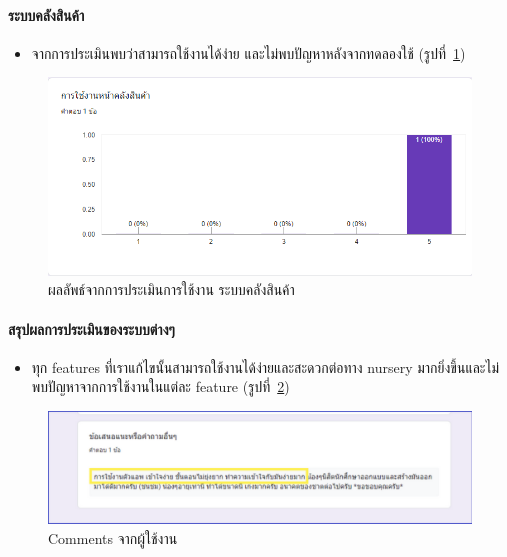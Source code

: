 \paragraph{ระบบคลังสินค้า}
\begin{itemize}
  \item จากการประเมินพบว่าสามารถใช้งานได้ง่าย และไม่พบปัญหาหลังจากทดลองใช้ (รูปที่~\ref{fig:Eval8})
\end{itemize}
\begin{figure}
  \begin{center}
    \includegraphics[width=\linewidth]{images/eval8.png}
  \end{center}
  \caption[ผลลัพธ์จากการประเมินการใช้งาน ระบบคลังสินค้า]{ผลลัพธ์จากการประเมินการใช้งาน ระบบคลังสินค้า}
  \label{fig:Eval8}
\end{figure}


\paragraph{สรุปผลการประเมินของระบบต่างๆ}
\begin{itemize}
  \item ทุก features ที่เราแก้ไขนั้นสามารถใช้งานได้ง่ายและสะดวกต่อทาง nursery มากยิ่งขึ้นและไม่พบปัญหาจากการใช้งานในแต่ละ feature (รูปที่~\ref{fig:Eval4})
\end{itemize}
\begin{figure}
  \begin{center}
    \includegraphics[width=\linewidth]{images/eval4.png}
  \end{center}
  \caption[Comments จากผู้ใช้งาน]{Comments จากผู้ใช้งาน}
  \label{fig:Eval4}
\end{figure}

